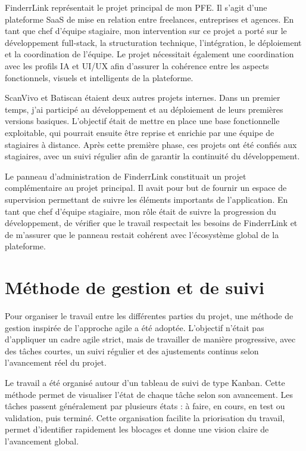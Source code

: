 FinderrLink représentait le projet principal de mon PFE. Il s'agit d'une plateforme SaaS de mise en relation entre freelances, entreprises et agences. En tant que chef d'équipe stagiaire, mon intervention sur ce projet a porté sur le développement full-stack, la structuration technique, l'intégration, le déploiement et la coordination de l'équipe. Le projet nécessitait également une coordination avec les profils IA et UI/UX afin d'assurer la cohérence entre les aspects fonctionnels, visuels et intelligents de la plateforme.

ScanVivo et Batiscan étaient deux autres projets internes. Dans un premier temps, j'ai participé au développement et au déploiement de leurs premières versions basiques. L'objectif était de mettre en place une base fonctionnelle exploitable, qui pourrait ensuite être reprise et enrichie par une équipe de stagiaires à distance. Après cette première phase, ces projets ont été confiés aux stagiaires, avec un suivi régulier afin de garantir la continuité du développement.

Le panneau d'administration de FinderrLink constituait un projet complémentaire au projet principal. Il avait pour but de fournir un espace de supervision permettant de suivre les éléments importants de l'application. En tant que chef d'équipe stagiaire, mon rôle était de suivre la progression du développement, de vérifier que le travail respectait les besoins de FinderrLink et de m'assurer que le panneau restait cohérent avec l'écosystème global de la plateforme.

\section{Méthode de gestion et de suivi}

Pour organiser le travail entre les différentes parties du projet, une méthode de gestion inspirée de l'approche agile a été adoptée. L'objectif n'était pas d'appliquer un cadre agile strict, mais de travailler de manière progressive, avec des tâches courtes, un suivi régulier et des ajustements continus selon l'avancement réel du projet.

Le travail a été organisé autour d'un tableau de suivi de type Kanban. Cette méthode permet de visualiser l'état de chaque tâche selon son avancement. Les tâches passent généralement par plusieurs états : à faire, en cours, en test ou validation, puis terminé. Cette organisation facilite la priorisation du travail, permet d'identifier rapidement les blocages et donne une vision claire de l'avancement global.

